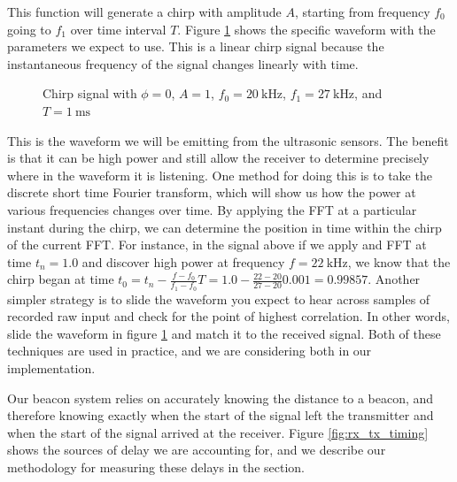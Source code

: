 \documentclass{article}
\newcommand{\cmmnt}[1]{\ignorespaces}
\begin{document}
This function will generate a chirp with amplitude $A$, starting from frequency $f_0$ going to $f_1$ over time interval $T$. Figure \ref{fig:chirp} shows the specific waveform with the parameters we expect to use. This is a linear chirp signal because the instantaneous frequency of the signal changes linearly with time.

\begin{figure}[H]
  \centering
  \label{fig:chirp}
  \caption{Chirp signal with $\phi=0$, $A=1$, $f_0=\SI{20}{\kilo\hertz}$, $f_1=\SI{27}{\kilo\hertz}$, and $T=\SI{1}{\milli\second}$}
\end{figure}

This is the waveform we will be emitting from the ultrasonic sensors. The benefit is that it can be high power and still allow the receiver to determine precisely where in the waveform it is listening. One method for doing this is to take the discrete short time Fourier transform, which will show us how the power at various frequencies changes over time. By applying the FFT at a particular instant during the chirp, we can determine the position in time within the chirp of the current FFT. For instance, in the signal above if we apply and FFT at time $t_n=1.0$ and discover high power at frequency $f=\SI{22}{\kilo\hertz}$, we know that the chirp began at time $t_0 = t_n - \tfrac{f - f_0}{f_1 - f_0}T = 1.0 - \tfrac{22-20}{27-20}0.001 = 0.99857$. Another simpler strategy is to slide the waveform you expect to hear across samples of recorded raw input and check for the point of highest correlation. In other words, slide the waveform in figure \ref{fig:chirp} and match it to the received signal. Both of these techniques are used in practice, and we are considering both in our implementation. \cmmnt{what are the pros and cons}

Our beacon system relies on accurately knowing the distance to a beacon, and therefore knowing exactly when the start of the signal left the transmitter and when the start of the signal arrived at the receiver. Figure \ref{fig:rx_tx_timing} shows the sources of delay we are accounting for, and we describe our methodology for measuring these delays in the  section.
\end{document}

